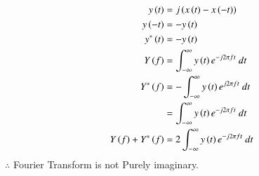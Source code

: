 \documentclass[journal,12pt,twocolumn]{IEEEtran}
\theoremstyle{remark}
\begin{document}
\begin{enumerate}
\begin{align}
  y\brak{t}&=j\brak{x\brak{t} - x\brak{-t}}\\
  y\brak{-t}&=-y\brak{t}\\
  y^*\brak{t}&=-y\brak{t}\\
  Y\brak{f}&=\int_{-\infty}^{\infty} y\brak{t} e^{-j 2\pi f t} \ dt\\
  Y^*\brak{f}&=-\int_{-\infty}^{\infty} y\brak{t} e^{j 2\pi f t} \ dt\\
  &=\int_{-\infty}^{\infty} y\brak{t} e^{-j 2\pi f t} \ dt\\
  Y\brak{f}+Y^*\brak{f}&=2\int_{-\infty}^{\infty} y\brak{t} e^{-j 2\pi f t} \ dt
  \end{align}
$\therefore$ Fourier Transform is not Purely imaginary.\\
\end{enumerate}
\end{document}
